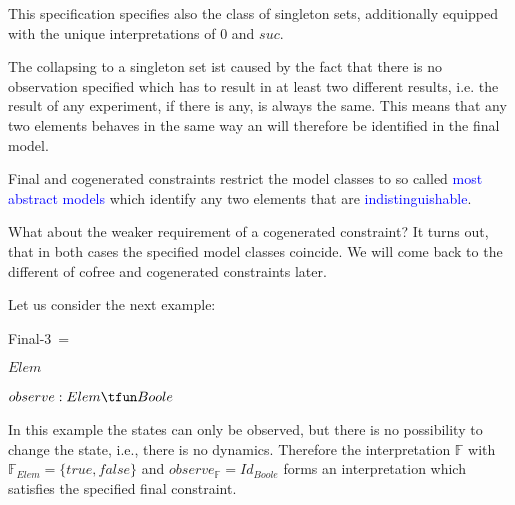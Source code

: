 \documentclass[landscape, autoslides, light]{mmiss}
\begin{document}
\begin{Package}[Label={FSDPT}, Title={Formal Specification of Data and Process Types}, ShortTitle={FSDPT}, Authors={Horst Reichel}, Date={February 2003}, LevelOfDetail=Lecture, Language=en-GB]
\begin{Section}[Title={Final Coalgebras as Process Types}, Label={section4}]
\begin{Section}[Title={Final Constraints}, Label={section4_1}]
\begin{Paragraph}[Title={Final Constraints}, Label=Paragraph89]
This specification specifies also the class of singleton sets,
additionally equipped with the unique interpretations of $0$ and
$suc$.

\end{Paragraph}
\begin{Paragraph}[Title={Final Constraints}, Label=Paragraph90]


 The collapsing to a singleton set ist caused by
the fact that there is no observation specified which has to
result in at least two different results, i.e. the result of any
experiment, if there is any,  is always the same. This means that
any two elements behaves in the same way an will therefore be
identified in the final model.

Final and cogenerated constraints restrict the model classes to so
called \textcolor{blue}{most abstract models} which identify any
two elements that are \textcolor{blue}{indistinguishable}.

\end{Paragraph}
\begin{Paragraph}[Label=Paragraph91]

What about the weaker requirement of a cogenerated constraint? It
turns out, that in both cases the specified model classes
coincide. We will come back to the different of cofree and
cogenerated constraints later.

\end{Paragraph}
\begin{Paragraph}[Label=Paragraph92]

Let us consider the next example:\pause
\begin{SpecDefn}{Final-3}~= \\ \Then
\item[\Cofree~\Group]
\begin{Items} \item[\Sort] \( Elem \)
\item[\Op] \( observe : Elem \tfun Boole \)~\EndGroup
\end{Items} \item[\End] \end{SpecDefn}
\pause
In this example the states can only be observed, but there is no
possibility to change the state, i.e., there is no dynamics.
Therefore the interpretation $ \mathbb{F}$ with $
\mathbb{F}_{Elem} = \{ true, false \}$ and $observe_{ \mathbb{F}}
= Id_{Boole}$ forms an interpretation which satisfies the
specified final constraint.


\end{Paragraph}
\end{Section}
\end{Section}
\end{Package}
\end{document}
